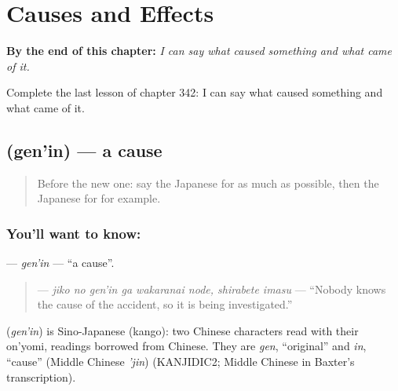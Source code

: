 
\chapter{Causes and Effects}
\label{ch:ja-causes-and-effects}

\begin{chapteropening}
\textbf{By the end of this chapter:} \emph{I can say what caused something and what came of it.}

Complete the last lesson of chapter 342: I can say what caused something and what came of it.
\end{chapteropening}

\section[\texorpdfstring{\ja{げんいん} (gen'in)}{げんいん (gen'in)}]{ (gen'in) — a cause}

\label{lesson:JA-C342-gen-in}



\begin{quote}
Before the new one: say the Japanese for as much as possible, then the Japanese for for example.
\end{quote}

\subsection*{You'll want to know: }
\textbf{} — \emph{gen'in} — \textquotedblleft{}a cause\textquotedblright{}.

\begin{quote}
\textbf{  } — \emph{jiko no gen'in ga wakaranai node, shirabete imasu} — \textquotedblleft{}Nobody knows the cause of the accident, so it is being investigated.\textquotedblright{}
\end{quote}

\begin{cousinweb}
\textbf{} (\emph{gen'in}) is Sino-Japanese (kango): two Chinese characters read with their on'yomi, readings borrowed from Chinese. They are \emph{gen}, \textquotedblleft{}original\textquotedblright{} and \emph{in}, \textquotedblleft{}cause\textquotedblright{} (Middle Chinese \emph{'jin}) (KANJIDIC2; Middle Chinese in Baxter's transcription).
\end{cousinweb}

